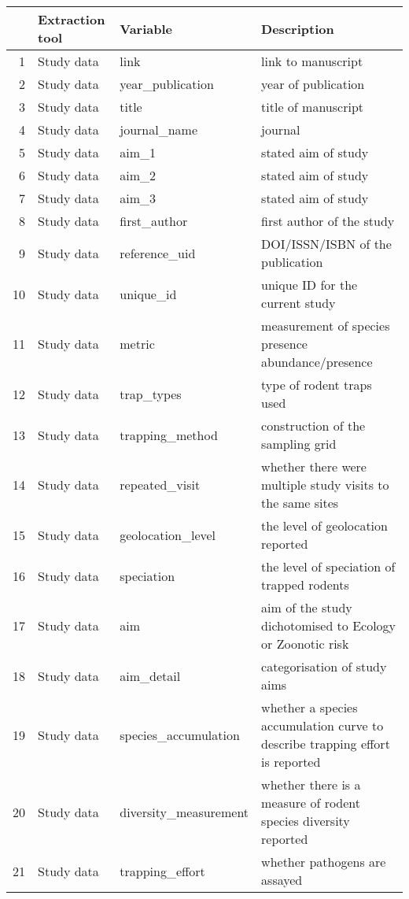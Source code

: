 \begin{table}[ht]
\centering
\begin{tabular}{rlll}
  \hline
 & Extraction tool & Variable & Description \\ 
  \hline
1 & Study data & link & link to manuscript \\ 
  2 & Study data & year\_publication & year of publication \\ 
  3 & Study data & title & title of manuscript \\ 
  4 & Study data & journal\_name & journal \\ 
  5 & Study data & aim\_1 & stated aim of study \\ 
  6 & Study data & aim\_2 & stated aim of study \\ 
  7 & Study data & aim\_3 & stated aim of study \\ 
  8 & Study data & first\_author & first author of the study \\ 
  9 & Study data & reference\_uid & DOI/ISSN/ISBN of the publication \\ 
  10 & Study data & unique\_id & unique ID for the current study \\ 
  11 & Study data & metric & measurement of species presence abundance/presence \\ 
  12 & Study data & trap\_types & type of rodent traps used \\ 
  13 & Study data & trapping\_method & construction of the sampling grid \\ 
  14 & Study data & repeated\_visit & whether there were multiple study visits to the same sites \\ 
  15 & Study data & geolocation\_level & the level of geolocation reported \\ 
  16 & Study data & speciation & the level of speciation of trapped rodents \\ 
  17 & Study data & aim & aim of the study dichotomised to Ecology or Zoonotic risk \\ 
  18 & Study data & aim\_detail & categorisation of study aims \\ 
  19 & Study data & species\_accumulation & whether a species accumulation curve to describe trapping effort is reported \\ 
  20 & Study data & diversity\_measurement & whether there is a measure of rodent species diversity reported \\ 
  21 & Study data & trapping\_effort & whether pathogens are assayed \\ 

\end{tabular}
\end{table}
